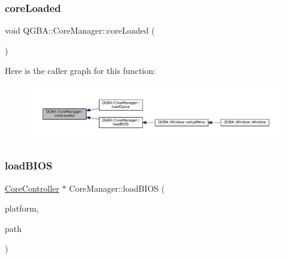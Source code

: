\subsubsection{\texorpdfstring{core\+Loaded}{coreLoaded}}
{\footnotesize\ttfamily void Q\+G\+B\+A\+::\+Core\+Manager\+::core\+Loaded (\begin{DoxyParamCaption}\item[{\mbox{\hyperlink{class_q_g_b_a_1_1_core_controller}{Core\+Controller}} $\ast$}]{ }\end{DoxyParamCaption})\hspace{0.3cm}{\ttfamily [signal]}}

Here is the caller graph for this function\+:
\nopagebreak
\begin{figure}[H]
\begin{center}
\leavevmode
\includegraphics[width=350pt]{class_q_g_b_a_1_1_core_manager_a09f8e6bf8380c7f4eb746863be3396d8_icgraph}
\end{center}
\end{figure}
\mbox{\label{class_q_g_b_a_1_1_core_manager_a84ddcb6a08e2961de873654fed736470}} 
\subsubsection{\texorpdfstring{load\+B\+I\+OS}{loadBIOS}}
{\footnotesize\ttfamily \mbox{\hyperlink{class_q_g_b_a_1_1_core_controller}{Core\+Controller}} $\ast$ Core\+Manager\+::load\+B\+I\+OS (\begin{DoxyParamCaption}\item[{\mbox{\hyperlink{ioapi_8h_a787fa3cf048117ba7123753c1e74fcd6}{int}}}]{platform,  }\item[{const Q\+String \&}]{path }\end{DoxyParamCaption})\hspace{0.3cm}{\ttfamily [slot]}}

